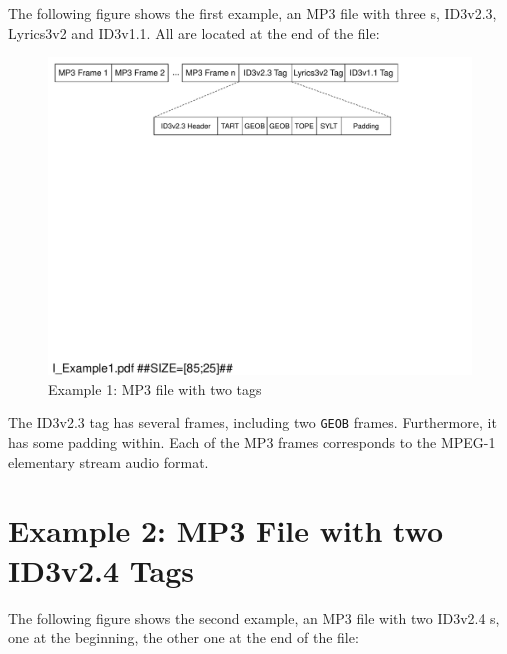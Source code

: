 The following figure shows the first example, an MP3 file with three \TERMtag{}s, ID3v2.3, Lyrics3v2 and ID3v1.1. All are located at the end of the file:

\begin{figure}[H]
\centering
\includegraphics[width=1.00\textwidth]{figures/I_Example1.pdf}
\caption{Example 1: MP3 file with two tags}
\label{fig:Example1MP3filewithtwotags}
\end{figure}

The ID3v2.3 tag has several frames, including two \texttt{GEOB} frames. Furthermore, it has some padding within. Each of the MP3 frames corresponds to the MPEG-1 elementary stream audio format.


\section{Example 2: MP3 File with two ID3v2.4 Tags}
\label{sec:Example2MP3FileWithID3v23AndID3v11}

The following figure shows the second example, an MP3 file with two ID3v2.4 \TERMtag{}s, one at the beginning, the other one at the end of the file:

